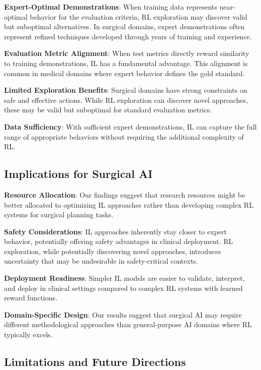 \documentclass[runningheads]{llncs}
\begin{document}
\textbf{Expert-Optimal Demonstrations}: When training data represents near-optimal behavior for the evaluation criteria, RL exploration may discover valid but suboptimal alternatives. In surgical domains, expert demonstrations often represent refined techniques developed through years of training and experience.

\textbf{Evaluation Metric Alignment}: When test metrics directly reward similarity to training demonstrations, IL has a fundamental advantage. This alignment is common in medical domains where expert behavior defines the gold standard.

\textbf{Limited Exploration Benefits}: Surgical domains have strong constraints on safe and effective actions. While RL exploration can discover novel approaches, these may be valid but suboptimal for standard evaluation metrics.

\textbf{Data Sufficiency}: With sufficient expert demonstrations, IL can capture the full range of appropriate behaviors without requiring the additional complexity of RL.

\subsection{Implications for Surgical AI}

\textbf{Resource Allocation}: Our findings suggest that research resources might be better allocated to optimizing IL approaches rather than developing complex RL systems for surgical planning tasks.

\textbf{Safety Considerations}: IL approaches inherently stay closer to expert behavior, potentially offering safety advantages in clinical deployment. RL exploration, while potentially discovering novel approaches, introduces uncertainty that may be undesirable in safety-critical contexts.

\textbf{Deployment Readiness}: Simpler IL models are easier to validate, interpret, and deploy in clinical settings compared to complex RL systems with learned reward functions.

\textbf{Domain-Specific Design}: Our results suggest that surgical AI may require different methodological approaches than general-purpose AI domains where RL typically excels.

\subsection{Limitations and Future Directions}
\end{document}
